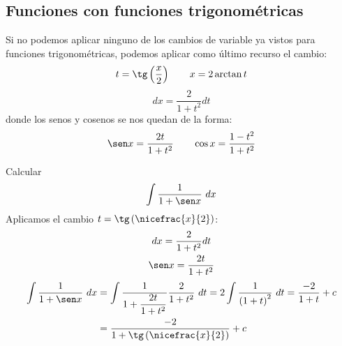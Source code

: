 \subsection{Funciones con funciones trigonométricas}
Si no podemos aplicar ninguno de los cambios de variable ya vistos para funciones trigonométricas, podemos aplicar como último recurso el cambio:
\begin{equation*}
    t = \tg\left(\dfrac{x}{2}\right)\qquad x=2\arctan t
\end{equation*}
\begin{equation*}
    dx = \dfrac{2}{1+t^2}dt
\end{equation*}
donde los senos y cosenos se nos quedan de la forma:
\begin{equation*}
    \sen x = \dfrac{2t}{1+t^2}\qquad \cos x = \dfrac{1-t^2}{1+t^2}
\end{equation*}

\begin{ejemplo}
    Calcular
    \begin{equation*}
        \displaystyle\int \dfrac{1}{1+\sen x}~dx 
    \end{equation*}
    Aplicamos el cambio $t = \tg\left(\nicefrac{x}{2}\right)$:
    \begin{gather*}
        dx = \dfrac{2}{1+t^2}dt\\
        \sen x = \dfrac{2t}{1+t^2}
    \end{gather*}
    \begin{align*}
        \displaystyle\int \dfrac{1}{1+\sen x}~dx &= \displaystyle\int \dfrac{1}{1+\dfrac{2t}{1+t^2}}\dfrac{2}{1+t^2}~dt = 2\displaystyle\int \dfrac{1}{{(1+t)}^{2}}~dt = \dfrac{-2}{1+t}+c \\
        &= \dfrac{-2}{1+\tg\left(\nicefrac{x}{2}\right)} + c
    \end{align*}
\end{ejemplo}
